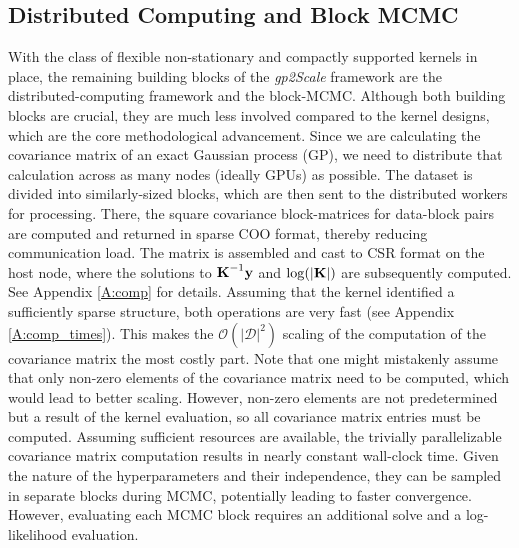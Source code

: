 \documentclass{article}
\renewcommand{\mathbf}[1]{%
  \ifx#1x x\else \textbf{#1}\fi
}
\begin{document}
\subsection{Distributed Computing and Block MCMC}
With the class of flexible non-stationary and compactly supported kernels in place, the remaining building blocks of the \emph{gp2Scale} framework are the distributed-computing framework and the block-MCMC. Although both building blocks are crucial, they are much less involved compared to the kernel designs, which are the core methodological advancement. Since we are calculating the covariance matrix of an exact Gaussian process (GP), we need to distribute that calculation across as many nodes (ideally GPUs) as possible. The dataset is divided into similarly-sized blocks, which are then sent to the distributed workers for processing. There, the square covariance block-matrices for data-block pairs are computed and returned in sparse COO format, thereby reducing communication load. The matrix is assembled and cast to CSR format on the host node, where the solutions to $\mathbf{K}^{-1} \mathbf{y}$ and $\log(|\mathbf{K}|)$ are subsequently computed. See Appendix \ref{A:comp} for details. Assuming that the kernel identified a sufficiently sparse structure, both operations are very fast (see Appendix \ref{A:comp_times}). This makes the $\mathcal{O}(|\mathcal{D}|^2)$ scaling of the computation of the covariance matrix the most costly part. Note that one might mistakenly assume that only non-zero elements of the covariance matrix need to be computed, which would lead to better scaling. However, non-zero elements are not predetermined but a result of the kernel evaluation, so all covariance matrix entries must be computed. Assuming sufficient resources are available, the trivially parallelizable covariance matrix computation results in nearly constant wall-clock time. Given the nature of the hyperparameters and their independence, they can be sampled in separate blocks during MCMC, potentially leading to faster convergence. However, evaluating each MCMC block requires an additional solve and a log-likelihood evaluation.
\end{document}
